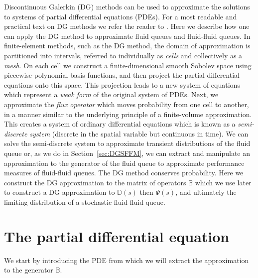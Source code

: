 Discontinuous Galerkin (DG) methods can be used to approximate the solutions to systems of partial differential equations (PDEs). For a most readable and practical text on DG methods we refer the reader to \cite{nodalDGBook}. Here we describe how one can apply the DG method to approximate fluid queues and fluid-fluid queues. In finite-element methods, such as the DG method, the domain of approximation is partitioned into intervals, referred to individually as \textit{cells} and collectively as a \textit{mesh}. On each cell we construct a finite-dimensional smooth Sobolev space using piecewise-polynomial basis functions, and then project the partial differential equations onto this space. This projection leads to a new system of equations which represent a \textit{weak form} of the original system of PDEs. Next, we approximate the \textit{flux operator} which moves probability from one cell to another, in a manner similar to the underlying principle of a finite-volume approximation. This creates a system of ordinary differential equations which is known as a \emph{semi-discrete system} (discrete in the spatial variable but continuous in time). We can solve the semi-discrete system to approximate transient distributions of the fluid queue or, as we do in Section~\ref{sec:DGSFFM}, we can extract and manipulate an approximation to the generator of the fluid queue to approximate performance measures of fluid-fluid queues. The DG method conserves probability. Here we construct the DG approximation to the matrix of operators \(\mathbb B\) which we use later to construct a DG approximation to \(\mathbb D(s)\) then \(\mathbb\Psi(s)\), and ultimately the limiting distribution of a stochastic fluid-fluid queue. 

\section{The partial differential equation}
We start by introducing the PDE from which we will extract the approximation to the generator \(\mathbb B\). 


